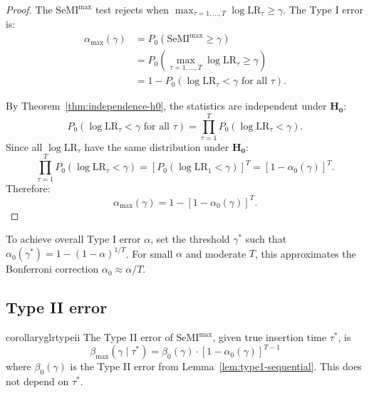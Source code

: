 \documentclass{article}
\theoremstyle{plain}
\theoremstyle{definition}
\theoremstyle{remark}
\renewcommand{\geq}{\geqslant}
\newcommand{\SeMImax}{\mathrm{SeMI}^{\max}}
\begin{document}
\begin{proof}
    The $\SeMImax$ test rejects when $\max_{\tau=1,\ldots,T} \log \mathrm{LR}_\tau \geq \gamma$. The Type I error is:
    \begin{align*}
        \alpha_{\max}(\gamma) & = P_0(\SeMImax \geq \gamma)                                            \\
                              & = P_0\left(\max_{\tau=1,\ldots,T} \log \mathrm{LR}_\tau \geq \gamma\right) \\
                              & = 1 - P_0(\log \mathrm{LR}_\tau < \gamma \text{ for all } \tau).
    \end{align*}

    By Theorem~\ref{thm:independence-h0}, the statistics are independent under $\mathbf{H_0}$:
    \begin{equation*}
        P_0(\log \mathrm{LR}_\tau < \gamma \text{ for all } \tau) = \prod_{\tau=1}^T P_0(\log \mathrm{LR}_\tau < \gamma).
    \end{equation*}
    Since all $\log \mathrm{LR}_\tau$ have the same distribution under $\mathbf{H_0}$:
    \begin{equation*}
        \prod_{\tau=1}^T P_0(\log \mathrm{LR}_\tau < \gamma) = [P_0(\log \mathrm{LR}_1 < \gamma)]^T = [1 - \alpha_0(\gamma)]^T.
    \end{equation*}
    Therefore:
    \begin{equation*}
        \alpha_{\max}(\gamma) = 1 - [1 - \alpha_0(\gamma)]^T.
    \end{equation*}
\end{proof}
To achieve overall Type I error $\alpha$, set the threshold $\gamma^*$ such that $\alpha_0(\gamma^*) = 1 - (1-\alpha)^{1/T}$. For small $\alpha$ and moderate $T$, this approximates the Bonferroni correction $\alpha_0 \approx \alpha/T$.

\subsection{Type II error}
\label{app:proof-glr-type2}

\begin{restatable}[$\SeMImax$ Type II Error]{corollary}{glrtypeii}
	\label{cor:glr-type2}
	The Type II error of $\SeMImax$, given true insertion time $\tau^*$, is
	\begin{equation*}
		\beta_{\max}(\gamma \mid \tau^*) = \beta_0(\gamma) \cdot [1 - \alpha_0(\gamma)]^{T-1}
	\end{equation*}
	where $\beta_0(\gamma)$ is the Type II error from Lemma~\ref{lem:type1-sequential}. This does not depend on $\tau^*$.
\end{restatable}
\end{document}
